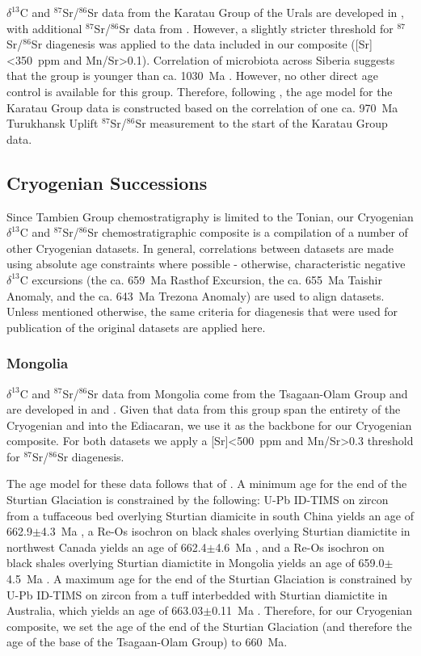 \documentclass[11pt,letterpaper]{article}
\newcommand{\dC}{$\delta^{13}$C\xspace}
\newcommand{\SrSr}{$^{87}$Sr/$^{86}$Sr\xspace}
\begin{document}
\dC and \SrSr data from the Karatau Group of the Urals are developed in \citet{Kuznetsov2006a}, with additional \SrSr data from \citep{Cox2016a}. However, a slightly stricter threshold for \SrSr diagenesis was applied to the data included in our composite ([Sr]\textless350~ppm and Mn/Sr\textgreater0.1). Correlation of microbiota across Siberia suggests that the group is younger than ca. 1030~Ma \citep{Kuznetsov2006a}. However, no other direct age control is available for this group. Therefore, following \citet{Cox2016a}, the age model for the Karatau Group data is constructed based on the correlation of one ca. 970~Ma Turukhansk Uplift \SrSr measurement to the start of the Karatau Group data.

\subsection*{Cryogenian Successions}

Since Tambien Group chemostratigraphy is limited to the Tonian, our Cryogenian \dC and \SrSr chemostratigraphic composite is a compilation of a number of other Cryogenian datasets. In general, correlations between datasets are made using absolute age constraints where possible - otherwise, characteristic negative \dC excursions (the ca. 659~Ma Rasthof Excursion, the ca. 655~Ma Taishir Anomaly, and the ca. 643~Ma Trezona Anomaly) are used to align datasets. Unless mentioned otherwise, the same criteria for diagenesis that were used for publication of the original datasets are applied here.

\subsubsection*{Mongolia}

\dC and \SrSr data from Mongolia come from the Tsagaan-Olam Group and are developed in \citet{Bold2016a} and \citet{Brasier1996a}. Given that data from this group span the entirety of the Cryogenian and into the Ediacaran, we use it as the backbone for our Cryogenian composite. For both datasets we apply a [Sr]\textless500~ppm and Mn/Sr\textgreater0.3 threshold for \SrSr diagenesis.

The age model for these data follows that of \citet{Bold2016a}. A minimum age for the end of the Sturtian Glaciation is constrained by the following: U-Pb ID-TIMS on zircon from a tuffaceous bed overlying Sturtian diamicite in south China yields an age of 662.9$\pm$4.3~Ma \citep{Zhou2004a}, a Re-Os isochron on black shales overlying Sturtian diamictite in northwest Canada yields an age of 662.4$\pm$4.6~Ma \citep{Rooney2014a}, and a Re-Os isochron on black shales overlying Sturtian diamictite in Mongolia yields an age of 659.0$\pm$4.5~Ma \citep{Rooney2015a}. A maximum age for the end of the Sturtian Glaciation is constrained by U-Pb ID-TIMS on zircon from a tuff interbedded with Sturtian diamictite in Australia, which yields an age of 663.03$\pm$0.11~Ma \citep{Cox2018b}. Therefore, for our Cryogenian composite, we set the age of the end of the Sturtian Glaciation (and therefore the age of the base of the Tsagaan-Olam Group) to 660~Ma.
\end{document}
